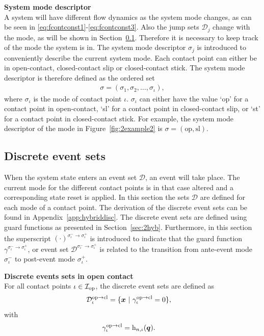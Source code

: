\documentclass[../DC2019003Bouma.tex]{subfiles}
\begin{document}
\textbf{System mode descriptor}\\
A system will have different flow dynamics as the system mode changes, as can be seen in \eqref{eq:fcontconst1}-\eqref{eq:fcontconst3}. Also the jump sets $\mathcal{D}_j$ change with the mode, as will be shown in Section~\ref{sec:2event}. Therefore it is necessary to keep track of the mode the system is in. The system mode descriptor $\sigma_j$ is introduced to conveniently describe the current system mode. Each contact point can either be in open-contact, closed-contact slip or closed-contact stick. The system mode descriptor is therefore defined as the ordered set
\begin{align}
\sigma = (\sigma_1,\sigma_2,\dots,\sigma_\iota),
\end{align}
where $\sigma_\iota$ is the mode of contact point $\iota$. $\sigma_\iota$ can either have the value `op' for a contact point in open-contact, `sl' for a contact point in closed-contact slip, or `st' for a contact point in closed-contact stick. For example, the system mode descriptor of the mode in Figure~\ref{fig:2example2} is $\sigma = (\text{op},\text{sl})$.

\subsection{Discrete event sets}\label{sec:2event}
When the system state enters an event set $\mathcal{D}$, an event will take place. The current mode for the different contact points is in that case altered and a corresponding state reset is applied. In this section the sets $\mathcal{D}$ are defined for each mode of a contact point. The derivation of the discrete event sets can be found in Appendix~\ref{app:hybriddisc}. The discrete event sets are defined using guard functions as presented in Section~\ref{sec:2hyb}. Furthermore, in this section the superscript $(\cdot)^{\sigma_\iota^-\rightarrow\sigma_\iota^+}$ is introduced to indicate that the guard function $\gamma^{\sigma_\iota^-\rightarrow\sigma_\iota^+}$, or event set $\mathcal{D}^{\sigma_\iota^-\rightarrow\sigma_\iota^+}$ is related to the transition from ante-event mode $\sigma_\iota^-$ to post-event mode $\sigma_\iota^+$.

\textbf{Discrete events sets in open contact}\\
For all contact points $\iota\in\mathcal{I}_{\text{op}}$, the discrete event sets are defined as
\begin{align}
\mathcal{D}^{\text{op}\rightarrow\text{cl}}_{\iota} &= \{ \xb\ |\ \gamma^{\text{op}\rightarrow\text{cl}}_{\iota} = 0 \},\label{eq:2Dopcl}
\end{align}
%
with
\begin{align}
\gamma^{\text{op}\rightarrow\text{cl}}_{\iota} &= \mathrm{h}_{n,\iota}({\boldsymbol{q}}).
\end{align}
\end{document}
